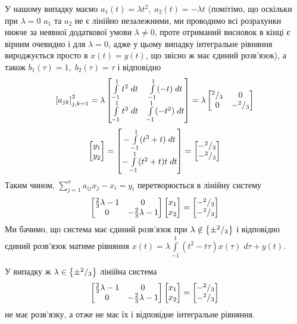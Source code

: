 \documentclass[12pt]{article} %
\newcommand{\dt}{\;dt}
\let\oldint\int
\renewcommand{\int}{\oldint\limits}
\begin{document}
У нашому випадку маємо $a_1(t)=\lambda t^2,\;a_2(t)=-\lambda t$ (помітімо, що оскільки при $\lambda=0$
$a_1$ та $a_2$ не є лінійно незалежними, ми проводимо всі розрахунки нижче за неявної додаткової умови
$\lambda\neq0$, проте отриманий висновок в кінці є вірним очевидно і для $\lambda=0$, адже у цьому
випадку інтегральне рівняння вироджується просто в $x(t)=y(t)$, що звісно ж 
має єдиний розв’язок), а також $b_1(\tau)=1,\;b_2(\tau)=\tau$ і відповідно
\[\mysbra{a_{jk}}_{j,k=1}^2=\lambda\begin{bmatrix}
	\int_{-1}^1t^2\dt&\int_{-1}^1(-t)\dt\\
	\int_{-1}^1t^3\dt&\int_{-1}^1(-t^2)\dt
\end{bmatrix}=\lambda\begin{bmatrix}\myfrac{2}{3}&0\\0&-\myfrac{2}{3}\end{bmatrix}\]
	\[\begin{bmatrix}y_1\\y_2\end{bmatrix}=
		\begin{bmatrix}-\int_{-1}^1(t^2+t)\dt\\-\int_{-1}^1(t^2+t)t\dt\end{bmatrix}=
			\begin{bmatrix}-\myfrac{2}{3}\\-\myfrac{2}{3}
		\end{bmatrix}
		\]
Таким чином, $\sum_{j=1}^na_{ij}x_j-x_i=y_i$ перетворюється в лінійну систему
\[\begin{bmatrix}\frac{2}{3}\lambda-1&0\\0&-\frac{2}{3}\lambda-1\end{bmatrix}\begin{bmatrix}x_1\\x_2\end{bmatrix}=
	\begin{bmatrix}-{^{2}/_{3}}\\-{^{2}/_{3}}\end{bmatrix}\]
		Ми бачимо, що система має єдиний розв’язок при $\lambda\notin\left\{\pm{^{2}/_{3}}\right\}$ і відповідно єдиний розв’язок матиме
		рівняння  $x(t)=\lambda\int_{-1}^1(t^2-t\tau)x(\tau)\;d\tau+y(t)$.

		У випадку ж $\lambda\in\left\{\pm{^{2}/_{3}}\right\}$ лінійна система
		\[\begin{bmatrix}\frac{2}{3}\lambda-1&0\\0&-\frac{2}{3}\lambda-1\end{bmatrix}\begin{bmatrix}x_1\\x_2\end{bmatrix}=
	\begin{bmatrix}-{^{2}/_{3}}\\-{^{2}/_{3}}\end{bmatrix}\]
		не має розв’язку, а отже не має їх і відповідне інтегральне рівняння.
\end{document}

